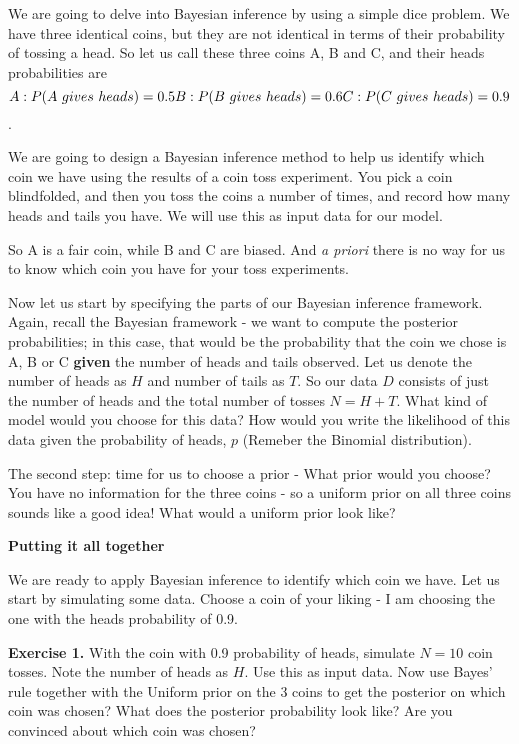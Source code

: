 \documentclass[
]{book}
\begin{document}
We are going to delve into Bayesian inference by using a simple dice problem. We have three identical coins, but they are not identical in terms of their probability of tossing a head. So let us call these three coins A, B and C, and their heads probabilities are \[A: P(A~gives~heads) = 0.5 \\B: P(B~gives~heads) =  0.6 \\ C: P(C~gives~heads) = 0.9\].

We are going to design a Bayesian inference method to help us identify which coin we have using the results of a coin toss experiment. You pick a coin blindfolded, and then you toss the coins a number of times, and record how many heads and tails you have. We will use this as input data for our model.

So A is a fair coin, while B and C are biased. And \emph{a priori} there is no way for us to know which coin you have for your toss experiments.

Now let us start by specifying the parts of our Bayesian inference framework. Again, recall the Bayesian framework - we want to compute the posterior probabilities; in this case, that would be the probability that the coin we chose is A, B or C \textbf{given} the number of heads and tails observed. Let us denote the number of heads as \(H\) and number of tails as \(T\). So our data \(D\) consists of just the number of heads and the total number of tosses \(N = H+T\). What kind of model would you choose for this data? How would you write the likelihood of this data given the probability of heads, \(p\) (Remeber the Binomial distribution).

The second step: time for us to choose a prior - What prior would you choose? You have no information for the three coins - so a uniform prior on all three coins sounds like a good idea! What would a uniform prior look like?

\textbf{Putting it all together}

We are ready to apply Bayesian inference to identify which coin we have. Let us start by simulating some data. Choose a coin of your liking - I am choosing the one with the heads probability of 0.9.

\textbf{Exercise 1.} With the coin with 0.9 probability of heads, simulate \(N=10\) coin tosses. Note the number of heads as \(H\). Use this as input data. Now use Bayes' rule together with the Uniform prior on the 3 coins to get the posterior on which coin was chosen? What does the posterior probability look like? Are you convinced about which coin was chosen?
\end{document}
